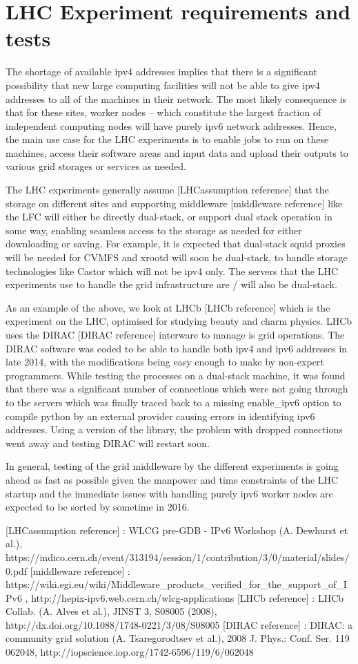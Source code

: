 \section{LHC Experiment requirements and tests}

The shortage of available ipv4 addresses implies that there is a significant possibility that new large
computing facilities will not be able to give ipv4 addresses to all of the machines in their network. The
most likely consequence is that for these sites, worker nodes -- which constitute the largest fraction of
independent computing nodes will have purely ipv6 network addresses. Hence, the main use case for the LHC
experiments is to enable jobs to run on these machines, access their software areas and input data and
upload their outputs to various grid storages or services as needed.

The LHC experiments generally assume [LHCassumption reference] that the storage on different sites and
supporting middleware [middleware reference] like the LFC will either be directly dual-stack, or support
dual stack operation in some way, enabling seamless access to the storage as needed for either downloading
or saving. For example, it is expected that dual-stack squid proxies will be needed for CVMFS and xrootd
will soon be dual-stack, to handle storage technologies like Castor which will not be ipv4 only. The
servers that the LHC experiments use to handle the grid infrastructure are / will also be dual-stack.

As an example of the above, we look at LHCb [LHCb reference] which is the experiment on the LHC, optimised
for studying beauty and charm physics. LHCb uses the DIRAC [DIRAC reference] interware to manage is grid
operations. The DIRAC software was coded to be able to handle both ipv4 and ipv6 addresses in late 2014,
with the modifications being easy enough to make by non-expert programmers. While testing the processes
on a dual-stack machine, it was found that there was a significant number of connections which were not
going through to the servers which was finally traced back to a missing enable\_ipv6 option to compile python
by an external provider causing errors in identifying ipv6 addresses. Using a version of the library, the
problem with dropped connections went away and testing DIRAC will restart soon.

In general, testing of the grid middleware by the different experiments is going ahead as fast as possible
given the manpower and time constraints of the LHC startup and the immediate issues with handling purely
ipv6 worker nodes are expected to be sorted by sometime in 2016.

[LHCassumption reference] : WLCG pre-GDB - IPv6 Workshop (A. Dewhurst et al.), https://indico.cern.ch/event/313194/session/1/contribution/3/0/material/slides/0.pdf
[middleware reference] : https://wiki.egi.eu/wiki/Middleware\_products\_verified\_for\_the\_support\_of\_IPv6 , http://hepix-ipv6.web.cern.ch/wlcg-applications
[LHCb reference] : LHCb Collab. (A. Alves et al.), JINST 3, S08005 (2008), http://dx.doi.org/10.1088/1748-0221/3/08/S08005
[DIRAC reference] : DIRAC: a community grid solution (A. Tsaregorodtsev et al.), 2008 J. Phys.: Conf. Ser. 119 062048, http://iopscience.iop.org/1742-6596/119/6/062048


